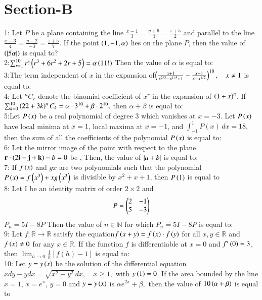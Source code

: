 \documentclass[journal,12pt,twocolumn]{IEEEtran}
\theoremstyle{remark}
\begin{document}
\section{Section-B}
1: Let $ P $ be a plane containing the line 
$\frac{x - 1}{3} = \frac{y + 6}{4} = \frac{z + 5}{2}$
and parallel to the line $\frac{x - 3}{4} = \frac{y - 2}{-3} = \frac{z + 5}{7}.$ If the point $\left(1, -1, \alpha\right)$ lies on the plane $P$, then the value of $\left(\left\vert5\alpha\right\vert\right)$ is equal to?\vspace{1mm}\\
2:$ \sum_{r=1}^{10} r! \left(r^3 + 6r^2 + 2r + 5\right) = \alpha\left(11!\right)$
Then the value of $\alpha$ is equal to:\vspace{1mm}\\
3:The term independent of $x$ in the expansion of$\left(\frac{x + 1}{x^{2/3} - x^{1/3} + 1} - \frac{x - 1}{x - x^{1/2}}\right)^{10}, \quad x \neq 1$ is equal to:\vspace{1mm} \\ 
4:  Let $^nC_r$ denote the binomial coefficient of $x^r$ in the expansion of $\left(1 + x\right)^n$. If $\sum_{k=0}^{10} \left(22 + 3k\right)   ^nC_k = \alpha \cdot 3^{10} + \beta \cdot 2^{10},$
then $\alpha + \beta$ is equal to: \vspace{1mm}\\
5:Let $P\left(x\right)$ be a real polynomial of degree 3 which vanishes at $x = -3$. Let $P\left(x\right)$ have local minima at $x = 1$, local maxima at $x = -1$, and $\int_{-1}^{1} P(x) \, dx = 18,$
then the sum of all the coefficients of the polynomial $P\left(x\right)$ is equal to:\vspace{1mm}\\
6: Let the mirror image of the point  with respect to the plane $\mathbf{r} \cdot \left(2\mathbf{i} - \mathbf{j} + \mathbf{k}\right) - b = 0$ be , Then, the value of $\left\vert a + b\right\vert$ is equal to:\vspace{1mm}\\
7: If $f\left(x\right)$ and $g{x}$ are two polynomials such that the polynomial $P\left(x\right) = f\left(x^3\right) + x g\left(x^3\right)$
is divisible by $x^2 + x + 1$, then $P\left(1\right)$ is equal to\vspace{1mm}\\
8: Let I be an identity matrix of order $2 \times 2$ and $$P = \begin{pmatrix}2&-1\\5&-3\end{pmatrix}$$ $P_n = 5I - 8P$
Then the value of $n \in \mathbb{N}$ for which $P_n = 5I - 8P$ is equal to:\vspace{1mm}\\
9: Let $f : \mathbb{R} \to \mathbb{R}$ satisfy the equation$f\left(x + y\right) = f\left(x\right) \cdot f\left(y\right)$ for all $x, y \in \mathbb{R}$ and $f\left(x\right) \neq 0$ for any $x \in \mathbb{R}$. If the function $f$ is differentiable at $x = 0$ and $f'\left(0\right) = 3$, then 
$\lim_{h \to 0} \frac{1}{h} [f(h) - 1] $
is equal to:\vspace{1mm}\\
10: Let $y = y\left(x\right)$ be the solution of the differential equation 
$x dy - y dx = \sqrt{x^2 - y^2} \, dx, \quad x \geq 1,$ with $y\left(1\right) = 0$. If the area bounded by the line $x = 1$, $x = e^\pi$, $y = 0$ and $y = y\left(x\right)$ is $\alpha e^{2\pi} + \beta, $
then the value of $10 \left(\alpha + \beta\right)$ is equal to
\end{document}
